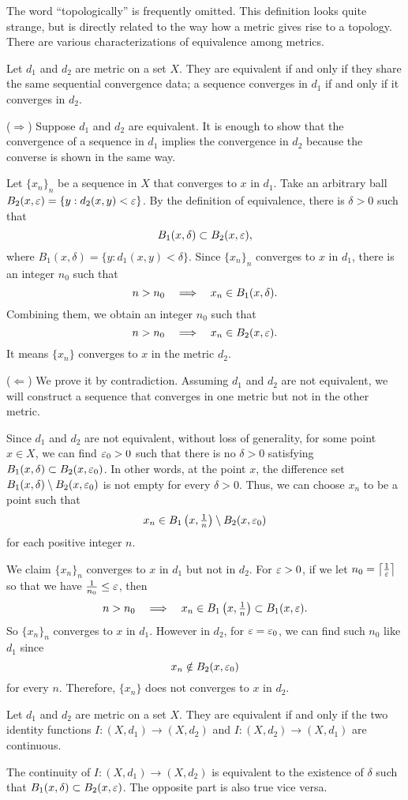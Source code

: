 \documentclass{../crs}
\begin{document}
The word ``topologically'' is frequently omitted.
This definition looks quite strange, but is directly related to the way how a metric gives rise to a topology.
There are various characterizations of equivalence among metrics.

\begin{prop}
Let $d_1$ and $d_2$ are metric on a set $X$.
They are equivalent if and only if they share the same sequential convergence data; a sequence converges in $d_1$ if and only if it converges in $d_2$.
\end{prop}
\begin{pf}
($\Rightarrow$)
Suppose $d_1$ and $d_2$ are equivalent.
It is enough to show that the convergence of a sequence in $d_1$ implies the convergence in $d_2$ because the converse is shown in the same way.

Let $\{x_n\}_n$ be a sequence in $X$ that converges to $x$ in $d_1$.
Take an arbitrary ball $B_2(x,\varepsilon)=\{y:d_2(x,y)<\varepsilon\}$.
By the definition of equivalence, there is $\delta>0$ such that
\[B_1(x,\delta)\subset B_2(x,\varepsilon),\]
where $B_1(x,\delta)=\{y:d_1(x,y)<\delta\}$.
Since $\{x_n\}_n$ converges to $x$ in $d_1$, there is an integer $n_0$ such that
\[n>n_0\impl x_n\in B_1(x,\delta).\]
Combining them, we obtain an integer $n_0$ such that
\[n>n_0\impl x_n\in B_2(x,\e).\]
It means $\{x_n\}$ converges to $x$ in the metric $d_2$.

($\Leftarrow$)
We prove it by contradiction.
Assuming $d_1$ and $d_2$ are not equivalent, we will construct a sequence that converges in one metric but not in the other metric.

Since $d_1$ and $d_2$ are not equivalent, without loss of generality, for some point $x\in X$, we can find $\varepsilon_0>0$ such that there is no $\delta>0$ satisfying $B_1(x,\delta)\subset B_2(x,\varepsilon_0)$.
In other words, at the point $x$, the difference set $B_1(x,\delta)\setminus B_2(x,\varepsilon_0)$ is not empty for every $\delta>0$.
Thus, we can choose $x_n$ to be a point such that
\[x_n\in B_1\left(x,\tfrac1n\right)\setminus B_2(x,\varepsilon_0)\]
for each positive integer $n$.

We claim $\{x_n\}_n$ converges to $x$ in $d_1$ but not in $d_2$.
For $\varepsilon>0$, if we let $n_0=\left\lceil\frac1{\varepsilon}\right\rceil$ so that we have $\frac1{n_0}\le\varepsilon$, then
\[n>n_0\impl x_n\in B_1\left(x,\tfrac1n\right)\subset B_1(x,\e).\]
So $\{x_n\}_n$ converges to $x$ in $d_1$.
However in $d_2$, for $\varepsilon=\varepsilon_0$, we can find such $n_0$ like $d_1$ since
\[x_n\notin B_2(x,\varepsilon_0)\]
for every $n$.
Therefore, $\{x_n\}$ does not converges to $x$ in $d_2$.
\end{pf}
\begin{prop}
Let $d_1$ and $d_2$ are metric on a set $X$.
They are equivalent if and only if the two identity functions $I:(X,d_1)\to(X,d_2)$ and $I:(X,d_2)\to(X,d_1)$ are continuous.
\end{prop}
\begin{pf}
The continuity of $I:(X,d_1)\to(X,d_2)$ is equivalent to the existence of $\delta$ such that $B_1(x,\delta)\subset B_2(x,\varepsilon)$.
The opposite part is also true vice versa.
\end{pf}
\end{document}
